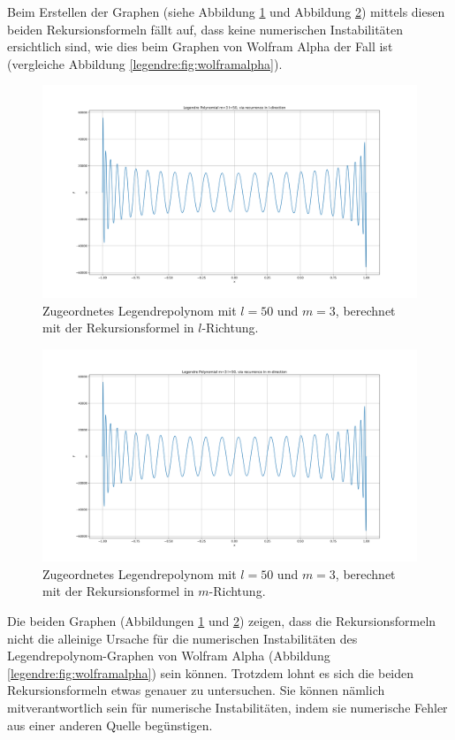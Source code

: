 Beim Erstellen der Graphen (siehe Abbildung \ref{legendre:fig:plot-l} und Abbildung \ref{legendre:fig:plot-m}) mittels diesen beiden Rekursionsformeln fällt auf, dass keine numerischen Instabilitäten ersichtlich sind, wie dies beim Graphen von Wolfram Alpha der Fall ist (vergleiche Abbildung \ref{legendre:fig:wolframalpha}).
\begin{figure}[!ht]
\centering
\includegraphics[width=1.0\linewidth]{papers/legendre/plots/plot_l}
\caption{Zugeordnetes Legendrepolynom mit \texorpdfstring{$l=50$}{l=50} und \texorpdfstring{$m=3$}{m=3}, berechnet mit der Rekursionsformel in \texorpdfstring{$l$}{l}-Richtung.}
\label{legendre:fig:plot-l}
\end{figure}
\begin{figure}[!ht]
\centering
\includegraphics[width=1.0\linewidth]{papers/legendre/plots/plot_m}
\caption{Zugeordnetes Legendrepolynom mit \texorpdfstring{$l=50$}{l=50} und \texorpdfstring{$m=3$}{m=3}, berechnet mit der Rekursionsformel in \texorpdfstring{$m$}{m}-Richtung.}
\label{legendre:fig:plot-m}
\end{figure}
Die beiden Graphen (Abbildungen \ref{legendre:fig:plot-l} und \ref{legendre:fig:plot-m}) zeigen, dass die Rekursionsformeln nicht die alleinige Ursache für die numerischen Instabilitäten des Legendrepolynom-Graphen von Wolfram Alpha (Abbildung \ref{legendre:fig:wolframalpha}) sein können.
Trotzdem lohnt es sich die beiden Rekursionsformeln etwas genauer zu untersuchen.
Sie können nämlich mitverantwortlich sein für numerische Instabilitäten, indem sie numerische Fehler aus einer anderen Quelle begünstigen.